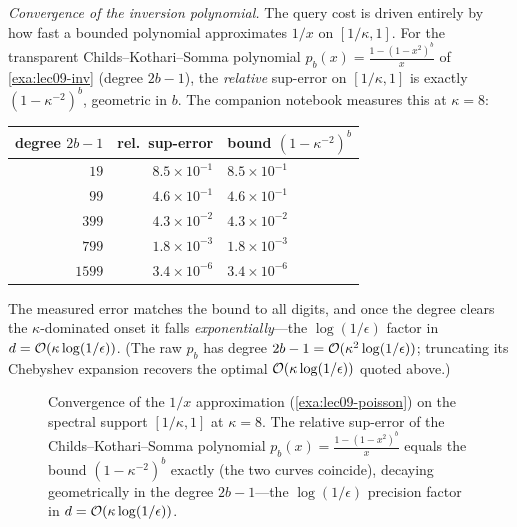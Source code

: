 \begin{example}
\emph{Convergence of the inversion polynomial.} The query cost is driven entirely by
how fast a bounded polynomial approximates $1/x$ on $[1/\kappa,1]$. For the transparent
Childs--Kothari--Somma polynomial $p_b(x)=\tfrac{1-(1-x^2)^b}{x}$ of
\cref{exa:lec09-inv} (degree $2b-1$), the \emph{relative} sup-error on $[1/\kappa,1]$ is
exactly $(1-\kappa^{-2})^b$, geometric in $b$. The companion notebook measures this at
$\kappa=8$:
\begin{center}
\begin{tabular}{r r l}
\toprule
degree $2b-1$ & rel.\ sup-error & bound $(1-\kappa^{-2})^b$\\
\midrule
$19$   & $8.5\times10^{-1}$ & $8.5\times10^{-1}$\\
$99$   & $4.6\times10^{-1}$ & $4.6\times10^{-1}$\\
$399$  & $4.3\times10^{-2}$ & $4.3\times10^{-2}$\\
$799$  & $1.8\times10^{-3}$ & $1.8\times10^{-3}$\\
$1599$ & $3.4\times10^{-6}$ & $3.4\times10^{-6}$\\
\bottomrule
\end{tabular}
\end{center}
The measured error matches the bound to all digits, and once the degree clears the
$\kappa$-dominated onset it falls \emph{exponentially}---the $\log(1/\epsilon)$ factor in
$d=\mathcal{O}(\kappa\log(1/\epsilon))$. (The raw $p_b$ has degree $2b-1=\mathcal{O}(\kappa^2\log
(1/\epsilon))$; truncating its Chebyshev expansion recovers the optimal
$\mathcal{O}(\kappa\log(1/\epsilon))$ quoted above.)
\begin{figure}[ht]
\centering
{}
\caption{Convergence of the $1/x$ approximation (\cref{exa:lec09-poisson}) on the
spectral support $[1/\kappa,1]$ at $\kappa=8$. The relative sup-error of the
Childs--Kothari--Somma polynomial $p_b(x)=\tfrac{1-(1-x^2)^b}{x}$ equals the bound
$(1-\kappa^{-2})^b$ exactly (the two curves coincide), decaying geometrically in the
degree $2b-1$---the $\log(1/\epsilon)$ precision factor in
$d=\mathcal{O}(\kappa\log(1/\epsilon))$.}
\label{fig:lec09-poisson-conv}
\end{figure}
\end{example}


